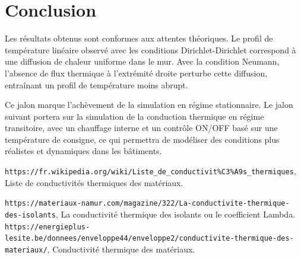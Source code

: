\documentclass[a4paper,11pt]{article}
\begin{document}
\section{Conclusion}
Les résultats obtenus sont conformes aux attentes théoriques. Le profil de température linéaire observé avec les conditions Dirichlet-Dirichlet correspond à une diffusion de chaleur uniforme dans le mur. Avec la condition Neumann, l'absence de flux thermique à l'extrémité droite perturbe cette diffusion, entraînant un profil de température moins abrupt.

Ce jalon marque l'achèvement de la simulation en régime stationnaire. Le jalon suivant portera sur la simulation de la conduction thermique en régime transitoire, avec un chauffage interne et un contrôle ON/OFF basé sur une température de consigne, ce qui permettra de modéliser des conditions plus réalistes et dynamiques dans les bâtiments.

\begin{thebibliography}{9}
     \texttt{https://fr.wikipedia.org/wiki/Liste\_de\_conductivit\%C3\%A9s\_thermiques}, Liste de conductivités thermiques des matériaux.

     \texttt{https://materiaux-namur.com/magazine/322/La-conductivite-thermique-des-isolants}, La conductivité thermique des isolants ou le coefficient Lambda.
    \bibitem{} \texttt{https://energieplus-lesite.be/donnees/enveloppe44/enveloppe2/conductivite-thermique-des-materiaux/}, Conductivité thermique des matériaux.
    
\end{thebibliography}
\end{document}
